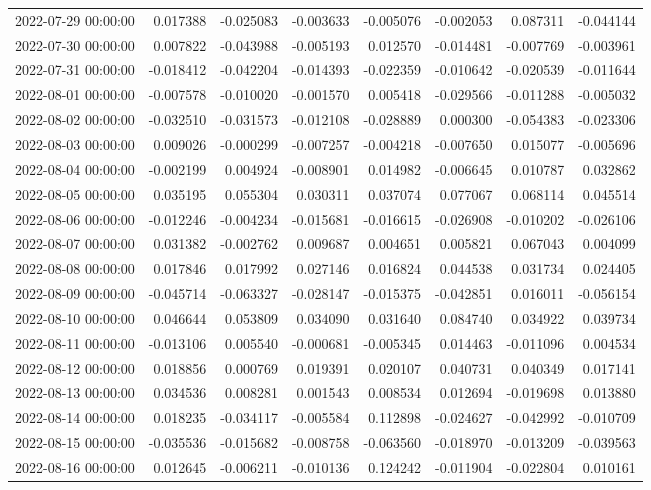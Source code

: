 \begin{tabular}{lrrrrrrr}
2022-07-29 00:00:00 & 0.017388 & -0.025083 & -0.003633 & -0.005076 & -0.002053 & 0.087311 & -0.044144 \\
2022-07-30 00:00:00 & 0.007822 & -0.043988 & -0.005193 & 0.012570 & -0.014481 & -0.007769 & -0.003961 \\
2022-07-31 00:00:00 & -0.018412 & -0.042204 & -0.014393 & -0.022359 & -0.010642 & -0.020539 & -0.011644 \\
2022-08-01 00:00:00 & -0.007578 & -0.010020 & -0.001570 & 0.005418 & -0.029566 & -0.011288 & -0.005032 \\
2022-08-02 00:00:00 & -0.032510 & -0.031573 & -0.012108 & -0.028889 & 0.000300 & -0.054383 & -0.023306 \\
2022-08-03 00:00:00 & 0.009026 & -0.000299 & -0.007257 & -0.004218 & -0.007650 & 0.015077 & -0.005696 \\
2022-08-04 00:00:00 & -0.002199 & 0.004924 & -0.008901 & 0.014982 & -0.006645 & 0.010787 & 0.032862 \\
2022-08-05 00:00:00 & 0.035195 & 0.055304 & 0.030311 & 0.037074 & 0.077067 & 0.068114 & 0.045514 \\
2022-08-06 00:00:00 & -0.012246 & -0.004234 & -0.015681 & -0.016615 & -0.026908 & -0.010202 & -0.026106 \\
2022-08-07 00:00:00 & 0.031382 & -0.002762 & 0.009687 & 0.004651 & 0.005821 & 0.067043 & 0.004099 \\
2022-08-08 00:00:00 & 0.017846 & 0.017992 & 0.027146 & 0.016824 & 0.044538 & 0.031734 & 0.024405 \\
2022-08-09 00:00:00 & -0.045714 & -0.063327 & -0.028147 & -0.015375 & -0.042851 & 0.016011 & -0.056154 \\
2022-08-10 00:00:00 & 0.046644 & 0.053809 & 0.034090 & 0.031640 & 0.084740 & 0.034922 & 0.039734 \\
2022-08-11 00:00:00 & -0.013106 & 0.005540 & -0.000681 & -0.005345 & 0.014463 & -0.011096 & 0.004534 \\
2022-08-12 00:00:00 & 0.018856 & 0.000769 & 0.019391 & 0.020107 & 0.040731 & 0.040349 & 0.017141 \\
2022-08-13 00:00:00 & 0.034536 & 0.008281 & 0.001543 & 0.008534 & 0.012694 & -0.019698 & 0.013880 \\
2022-08-14 00:00:00 & 0.018235 & -0.034117 & -0.005584 & 0.112898 & -0.024627 & -0.042992 & -0.010709 \\
2022-08-15 00:00:00 & -0.035536 & -0.015682 & -0.008758 & -0.063560 & -0.018970 & -0.013209 & -0.039563 \\
2022-08-16 00:00:00 & 0.012645 & -0.006211 & -0.010136 & 0.124242 & -0.011904 & -0.022804 & 0.010161 \\

\end{tabular}
